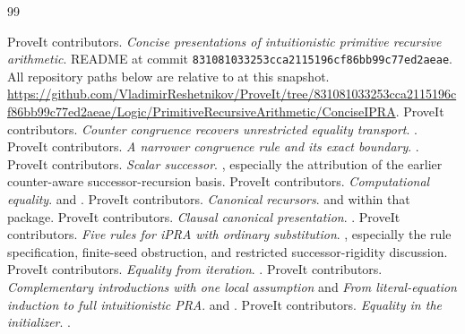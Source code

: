 \documentclass[11pt,letterpaper]{article}
\theoremstyle{definition}
\begin{document}
\clearpage
\begin{thebibliography}{99}\small\raggedright
{} ProveIt contributors.
\emph{Concise presentations of intuitionistic primitive recursive arithmetic}.
README at commit \texttt{831081033253cca2115196cf86bb99c77ed2aeae}.
All repository paths below are relative to
 at this snapshot.
\url{https://github.com/VladimirReshetnikov/ProveIt/tree/831081033253cca2115196cf86bb99c77ed2aeae/Logic/PrimitiveRecursiveArithmetic/ConciseIPRA}.
 ProveIt contributors.
\emph{Counter congruence recovers unrestricted equality transport}.
.
 ProveIt contributors.
\emph{A narrower congruence rule and its exact boundary}.
.
 ProveIt contributors.
\emph{Scalar successor}.
, especially the attribution
of the earlier counter-aware successor-recursion basis.
 ProveIt contributors.
\emph{Computational equality}.
 and
.
 ProveIt contributors.
\emph{Canonical recursors}.
 and
 within that package.
 ProveIt contributors.
\emph{Clausal canonical presentation}.
.
 ProveIt contributors.
\emph{Five rules for iPRA with ordinary substitution}.
,
especially the rule specification, finite-seed obstruction, and
restricted successor-rigidity discussion.
 ProveIt contributors.
\emph{Equality from iteration}.
.
 ProveIt contributors.
\emph{Complementary introductions with one local assumption} and
\emph{From literal-equation induction to full intuitionistic PRA}.
and .
 ProveIt contributors.
\emph{Equality in the initializer}.
.
\end{thebibliography}
\end{document}
